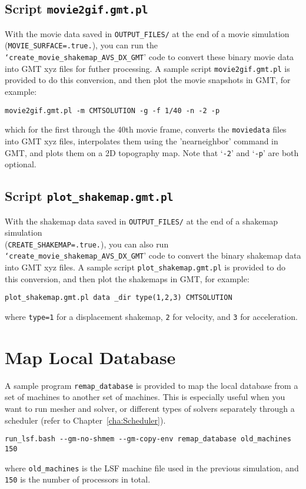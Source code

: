 \subsection{Script \texttt{movie2gif.gmt.pl}}

With the movie data saved in \texttt{OUTPUT\_FILES/} at the end of
a movie simulation (\texttt{\small MOVIE\_SURFACE=.true.}{\small ),
you can run the }\texttt{\small `create\_movie\_shakemap\_AVS\_DX\_GMT}{\small '
code to convert these binary movie data into GMT xyz files for futher
processing. A sample script }\texttt{\small movie2gif.gmt.pl}{\small{}
is provided to do this conversion, and then plot the movie snapshots
in GMT, for example:}{\small \par}
\begin{verbatim}
movie2gif.gmt.pl -m CMTSOLUTION -g -f 1/40 -n -2 -p
\end{verbatim}
which for the first through the 40th movie frame, converts the \texttt{moviedata}
files into GMT xyz files, interpolates them using the 'nearneighbor'
command in GMT, and plots them on a 2D topography map. Note that `\texttt{-2}'
and `\texttt{-p}' are both optional.


\subsection{Script \texttt{plot\_shakemap.gmt.pl}}

With the shakemap data saved in \texttt{OUTPUT\_FILES/} at the end
of a shakemap simulation ~\\
 (\texttt{CREATE\_SHAKEMAP=.true.}), you can also run \texttt{`create\_movie\_shakemap\_AVS\_DX\_GMT}'
code to convert the binary shakemap data into GMT xyz files. A sample
script \texttt{plot\_shakemap.gmt.pl} is provided to do this conversion,
and then plot the shakemaps in GMT, for example:
\begin{verbatim}
plot_shakemap.gmt.pl data _dir type(1,2,3) CMTSOLUTION
\end{verbatim}
where \texttt{type=1} for a displacement shakemap, \texttt{2} for
velocity, and \texttt{3} for acceleration.


\section{Map Local Database}

A sample program \texttt{remap\_database} is provided to map the local
database from a set of machines to another set of machines. This is
especially useful when you want to run mesher and solver, or different
types of solvers separately through a scheduler (refer to Chapter~\ref{cha:Scheduler}).
\begin{verbatim}
run_lsf.bash --gm-no-shmem --gm-copy-env remap_database old_machines 150
\end{verbatim}
where \texttt{old\_machines} is the LSF machine file used in the previous
simulation, and \texttt{150} is the number of processors in total.


